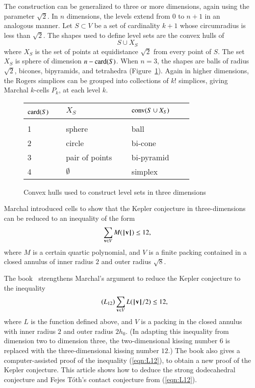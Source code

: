 \documentclass{llncs}
\begin{document}
The construction can be generalized to three or more dimensions,
again using the parameter $\sqrt2$.   In $n$ dimensions, the levels extend
from $0$ to $n+1$ in an analogous manner.  Let $S\subset V$ be a set of
cardinality $k+1$ whose circumradius is less than $\sqrt2$.
The shapes used to define level sets are the convex hulls of
\[
S \cup X_S
\]
where $X_S$ is the set of points at equidistance $\sqrt2$ from every
point of $S$. The set $X_S$ is sphere of dimension $n-{\operatorname{card}}(S)$. 
When $n=3$, the shapes are balls of radius $\sqrt2$,
bicones, bipyramids, and tetrahedra (Figure~\ref{fig:table}).  Again
in higher dimensions, the Rogers simplices can be grouped into
collections of $k!$ simplices, giving Marchal $k$-cells $P_k$, at each
level $k$.

\begin{figure}[h!]
\centering
\begin{tabular}{l l l l l}
\hline
${\operatorname{card}}(S)$~~ &$X_S$  
&${\operatorname{conv}}(S\cup X_S)$\\ [0.5ex]
\hline \\
1 &sphere& ball\\
2& circle& bi-cone\\
3& pair of points~~~& bi-pyramid\\
4& $\emptyset$ & simplex\\
 [1ex]
\hline
\end{tabular}
\caption{Convex hulls used to construct level sets in three dimensions}
\label{fig:table}
\end{figure}


\begin{remark} Marchal introduced cells to show that the Kepler
  conjecture in three-dimensions can be reduced to an inequality of
  the form
\[
\sum_{{\mathbf v}\in V} M({{\hskip0.1em|\hskip-0.15em|\hskip0.1em}{\mathbf v}{\hskip0.1em|\hskip-0.15em|\hskip0.1em}}) \le 12,
\]
where $M$ is a certain quartic polynomial, and $V$ is a finite packing 
contained in a closed annulus of inner radius $2$ and outer
radius $\sqrt8$.  
\end{remark}

\begin{remark}
The book~\cite{DSP} strengthens Marchal's argument to reduce
the Kepler conjecture to the inequality
\begin{equation}\label{eqn:L12}\tag{$L_{12}$}
\sum_{\v \in V} L(\normo{\v}/2) \le 12,
\end{equation}
where $L$ is the function defined above, and $V$ is a packing in the
closed annulus with inner radius $2$ and outer radius $2h_0$.  (In
adapting this inequality from dimension two to dimension three, the
two-dimensional kissing number $6$ is replaced with the
three-dimensional kissing number $12$.) The book also gives a
computer-assisted proof of the inequality (\ref{eqn:L12}), to obtain a
new proof of the Kepler conjecture.  This article shows how to deduce
the strong dodecahedral conjecture and Fejes T\'oth's contact
conjecture from (\ref{eqn:L12}).
\end{remark}
\end{document}
